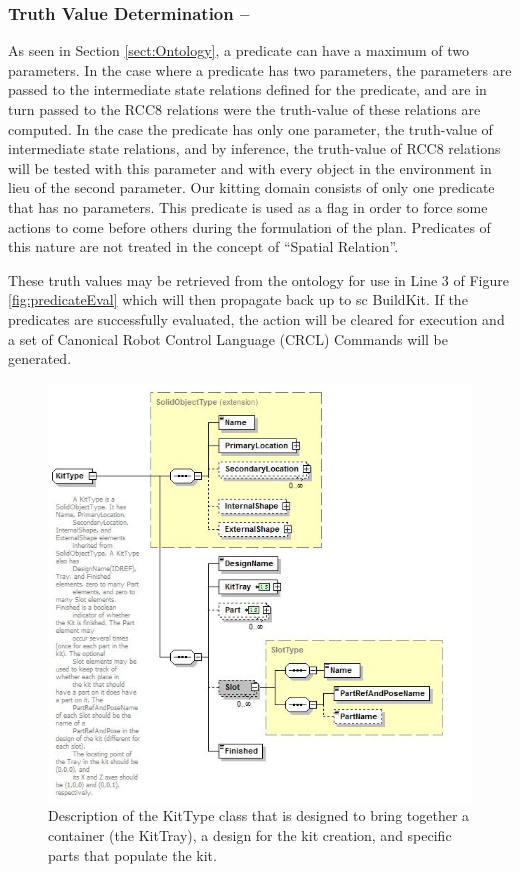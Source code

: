\subsubsection{Truth Value Determination --}
As seen in Section \ref{sect:Ontology}, a predicate can have a maximum of two parameters. In the case where a predicate has two parameters, the parameters are passed to the intermediate state relations defined for the predicate, and are in turn passed to the RCC8 relations were the truth-value of these relations are computed. In the case the predicate has only one parameter, the truth-value of intermediate state relations, and by inference, the truth-value of RCC8 relations will be tested with this parameter and with every object in the environment in lieu of the second parameter. Our kitting domain consists of only one predicate that has no parameters. This predicate is used as a flag in order to force some actions to come before others during the formulation of the plan. Predicates of this nature are not treated in the concept of ``Spatial Relation''.

These truth values may be retrieved from the ontology for use in Line 3 of Figure
\ref{fig:predicateEval} which will then propagate back up to {sc BuildKit}. If
the predicates are successfully evaluated, the action will be cleared for 
execution and a set of Canonical Robot Control Language (CRCL) Commands will be 
generated.
%
\begin{figure}[htb!]
\begin{center}
\includegraphics[width=12cm]{images/Kit.jpg}
\caption{Description of the KitType class that is designed to bring together
a container (the KitTray), a design for the kit creation, and specific parts
that populate the kit.}
\label{fig:kit}
\end{center}
\end{figure}
%
